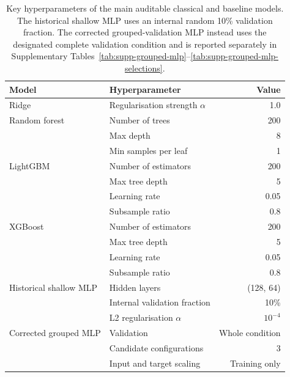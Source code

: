 \begin{table}[htbp]
\centering
\caption{Key hyperparameters of the main auditable classical and baseline models.
The historical shallow MLP uses an internal random 10\% validation fraction.
The corrected grouped-validation MLP instead uses the designated complete
validation condition and is reported separately in Supplementary
Tables~\ref{tab:supp-grouped-mlp}--\ref{tab:supp-grouped-mlp-selections}.}
\label{tbl:hyperparams}
\setlength{\tabcolsep}{8pt}
\renewcommand{\arraystretch}{1.25}
\begin{tabular}{@{}llr@{}}
\toprule
\textbf{Model} & \textbf{Hyperparameter} & \textbf{Value} \\
\midrule
Ridge                & Regularisation strength $\alpha$   & 1.0 \\
\addlinespace[4pt]
Random forest        & Number of trees                    & 200 \\
                     & Max depth                          & 8 \\
                     & Min samples per leaf               & 1 \\
\addlinespace[4pt]
LightGBM             & Number of estimators               & 200 \\
                     & Max tree depth                     & 5 \\
                     & Learning rate                      & 0.05 \\
                     & Subsample ratio                    & 0.8 \\
\addlinespace[4pt]
XGBoost              & Number of estimators               & 200 \\
                     & Max tree depth                     & 5 \\
                     & Learning rate                      & 0.05 \\
                     & Subsample ratio                    & 0.8 \\
\addlinespace[4pt]
Historical shallow MLP & Hidden layers                    & (128, 64) \\
                     & Internal validation fraction       & 10\% \\
                     & L2 regularisation $\alpha$         & $10^{-4}$ \\
Corrected grouped MLP & Validation                        & Whole condition \\
                     & Candidate configurations           & 3 \\
                     & Input and target scaling           & Training only \\
\bottomrule
\end{tabular}
\end{table}

